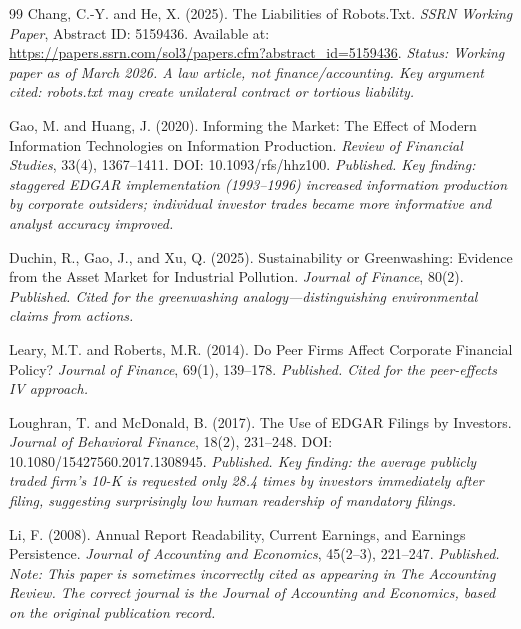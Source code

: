 \documentclass[12pt,a4paper]{article}
\begin{document}
\begin{thebibliography}{99}
Chang, C.-Y. and He, X. (2025).
\newblock The Liabilities of Robots.Txt.
\newblock \emph{SSRN Working Paper}, Abstract ID: 5159436.
\newblock Available at: \url{https://papers.ssrn.com/sol3/papers.cfm?abstract_id=5159436}.
\newblock \textit{Status: Working paper as of March 2026. A law article, not finance/accounting. Key argument cited: robots.txt may create unilateral contract or tortious liability.}

Gao, M. and Huang, J. (2020).
\newblock Informing the Market: The Effect of Modern Information Technologies on Information Production.
\newblock \emph{Review of Financial Studies}, 33(4), 1367--1411.
\newblock DOI: 10.1093/rfs/hhz100.
\newblock \textit{Published. Key finding: staggered EDGAR implementation (1993--1996) increased information production by corporate outsiders; individual investor trades became more informative and analyst accuracy improved.}

Duchin, R., Gao, J., and Xu, Q. (2025).
\newblock Sustainability or Greenwashing: Evidence from the Asset Market for Industrial Pollution.
\newblock \emph{Journal of Finance}, 80(2).
\newblock \textit{Published. Cited for the greenwashing analogy---distinguishing environmental claims from actions.}

Leary, M.T. and Roberts, M.R. (2014).
\newblock Do Peer Firms Affect Corporate Financial Policy?
\newblock \emph{Journal of Finance}, 69(1), 139--178.
\newblock \textit{Published. Cited for the peer-effects IV approach.}

Loughran, T. and McDonald, B. (2017).
\newblock The Use of EDGAR Filings by Investors.
\newblock \emph{Journal of Behavioral Finance}, 18(2), 231--248.
\newblock DOI: 10.1080/15427560.2017.1308945.
\newblock \textit{Published. Key finding: the average publicly traded firm's 10-K is requested only 28.4 times by investors immediately after filing, suggesting surprisingly low human readership of mandatory filings.}

Li, F. (2008).
\newblock Annual Report Readability, Current Earnings, and Earnings Persistence.
\newblock \emph{Journal of Accounting and Economics}, 45(2--3), 221--247.
\newblock \textit{Published. Note: This paper is sometimes incorrectly cited as appearing in The Accounting Review. The correct journal is the Journal of Accounting and Economics, based on the original publication record.}


\end{thebibliography}
\end{document}
